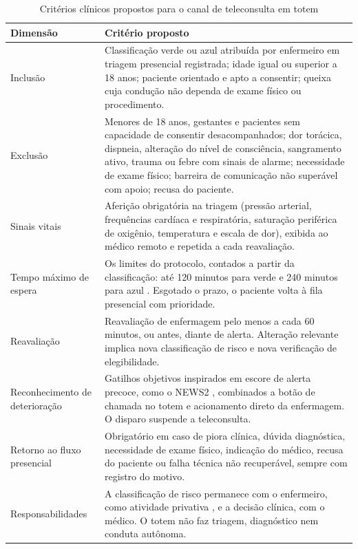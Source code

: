 \begin{table}[H]
\centering
\caption{Critérios clínicos propostos para o canal de teleconsulta em totem}
\label{tab:criterios}
\footnotesize
\begin{tabularx}{\textwidth}{L{3.3cm} Y}
\toprule
\textbf{Dimensão} & \textbf{Critério proposto} \\
\midrule
Inclusão & Classificação verde ou azul atribuída por enfermeiro em triagem presencial registrada; idade igual ou superior a 18 anos; paciente orientado e apto a consentir; queixa cuja condução não dependa de exame físico ou procedimento. \\
Exclusão & Menores de 18 anos, gestantes e pacientes sem capacidade de consentir desacompanhados; dor torácica, dispneia, alteração do nível de consciência, sangramento ativo, trauma ou febre com sinais de alarme; necessidade de exame físico; barreira de comunicação não superável com apoio; recusa do paciente. \\
Sinais vitais & Aferição obrigatória na triagem (pressão arterial, frequências cardíaca e respiratória, saturação periférica de oxigênio, temperatura e escala de dor), exibida ao médico remoto e repetida a cada reavaliação. \\
Tempo máximo de espera & Os limites do protocolo, contados a partir da classificação: até 120 minutos para verde e 240 minutos para azul \cite{stormversloot2014}. Esgotado o prazo, o paciente volta à fila presencial com prioridade. \\
Reavaliação & Reavaliação de enfermagem pelo menos a cada 60 minutos, ou antes, diante de alerta. Alteração relevante implica nova classificação de risco e nova verificação de elegibilidade. \\
Reconhecimento de deterioração & Gatilhos objetivos inspirados em escore de alerta precoce, como o NEWS2 \cite{rcp2017news2}, combinados a botão de chamada no totem e acionamento direto da enfermagem. O disparo suspende a teleconsulta. \\
Retorno ao fluxo presencial & Obrigatório em caso de piora clínica, dúvida diagnóstica, necessidade de exame físico, indicação do médico, recusa do paciente ou falha técnica não recuperável, sempre com registro do motivo. \\
Responsabilidades & A classificação de risco permanece com o enfermeiro, como atividade privativa \cite{cofen661}, e a decisão clínica, com o médico. O totem não faz triagem, diagnóstico nem conduta autônoma. \\
\bottomrule
\end{tabularx}
\end{table}

